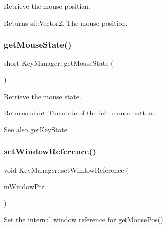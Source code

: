 Retrieve the mouse position. 

\begin{DoxyReturn}{Returns}
sf\+::\+Vector2i The mouse position. 
\end{DoxyReturn}
\mbox{\label{class_key_manager_a4cdc82bbf58d5c140c3512563f090e59}} 
\subsubsection{\texorpdfstring{get\+Mouse\+State()}{getMouseState()}}
{\footnotesize\ttfamily short Key\+Manager\+::get\+Mouse\+State (\begin{DoxyParamCaption}{ }\end{DoxyParamCaption})\hspace{0.3cm}{\ttfamily [static]}}



Retrieve the mouse state. 

\begin{DoxyReturn}{Returns}
short The state of the left mouse button.
\end{DoxyReturn}
\begin{DoxySeeAlso}{See also}
\mbox{\hyperlink{class_key_manager_a6769c626a0ac7e919979e9128dfb6a88}{get\+Key\+State}} 
\end{DoxySeeAlso}
\mbox{\label{class_key_manager_a48403a4f4e0619e4cb2de536c397647c}} 
\subsubsection{\texorpdfstring{set\+Window\+Reference()}{setWindowReference()}}
{\footnotesize\ttfamily void Key\+Manager\+::set\+Window\+Reference (\begin{DoxyParamCaption}\item[{sf\+::\+Render\+Window $\ast$}]{m\+Window\+Ptr }\end{DoxyParamCaption})\hspace{0.3cm}{\ttfamily [static]}}



Set the internal window reference for \mbox{\hyperlink{class_key_manager_aae40b808bf243100e3da7e63fb8cebe5}{get\+Mouse\+Pos()}} 


